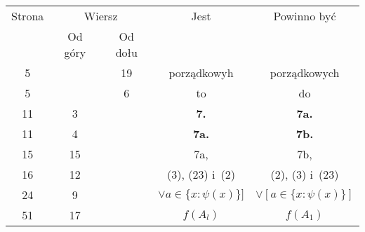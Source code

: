 \documentclass[a4paper,11pt]{article}
\numberwithin{equation}{section}
\begin{document}
\begin{center}

  \begin{tabular}{|c|c|c|c|c|}
    \hline
    Strona & \multicolumn{2}{c|}{Wiersz} & Jest
                              & Powinno być \\ \cline{2-3}
    & Od góry & Od dołu & & \\
    \hline
    5   & & 19 & porządkowyh & porządkowych \\
    5   & &  6 & to & do \\
    11  &  3 & & \textbf{7.} & \textbf{7a.} \\
    11  &  4 & & \textbf{7a.} & \textbf{7b.} \\
    15  & 15 & & 7a, & 7b, \\
    16  & 12 & & (3), (23) i~(2) & (2), (3) i~(23) \\
    24  &  9 & & $\lor a \in \{ x : \psi( x ) \} ]$ & $\lor [ a \in \{ x : \psi( x ) \} ]$ \\
    51  & 17 & & $f( A_{ l } )$ & $f( A_{ 1 } )$ \\
    \hline
  \end{tabular}






\end{center}
\end{document}

